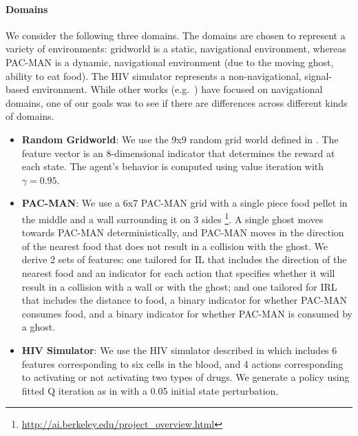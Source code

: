 \documentclass{article}
\begin{document}
\paragraph{Domains}
We consider the following three domains. The domains are chosen to represent a variety of environments: gridworld is a static, navigational environment, whereas PAC-MAN is a dynamic, navigational environment (due to the moving ghost, ability to eat food). The HIV simulator represents a non-navigational, signal-based environment. While other works (e.g.~\cite{amir2018highlights,huang17communicate}) have focused on navigational domains, one of our goals was to see if there are differences across different kinds of domains.
\begin{itemize}
  \item \textbf{Random Gridworld}: We use the 9x9 random grid world defined in \cite{brown2018machineteachingirl}. The feature vector is an 8-dimensional indicator that determines the reward at each state. The agent's behavior is computed using value iteration with $\gamma= 0.95$.
  \item \textbf{PAC-MAN}: We use a 6x7 PAC-MAN grid with a single piece food pellet in the middle and a wall surrounding it on 3 sides \footnote{\url{http://ai.berkeley.edu/project_overview.html}}. A single ghost moves towards PAC-MAN deterministically, and PAC-MAN moves in the direction of the nearest food that does not result in a collision with the ghost. We derive 2 sets of features: one tailored for IL that includes the direction of the nearest food and an indicator for each action that specifies whether it will result in a collision with a wall or with the ghost; and one tailored for IRL that includes the distance to food, a binary indicator for whether PAC-MAN consumes food, and a binary indicator for whether PAC-MAN is consumed by a ghost.
  \item \textbf{HIV Simulator}: We use the HIV simulator described in \cite{adams2005hiv} which includes 6 features corresponding to six cells in the blood, and 4 actions corresponding to activating or not activating two types of drugs. We generate a policy using fitted Q iteration as in \cite{ernst2006clinical} with a 0.05 initial state perturbation.
\end{itemize}
\end{document}

